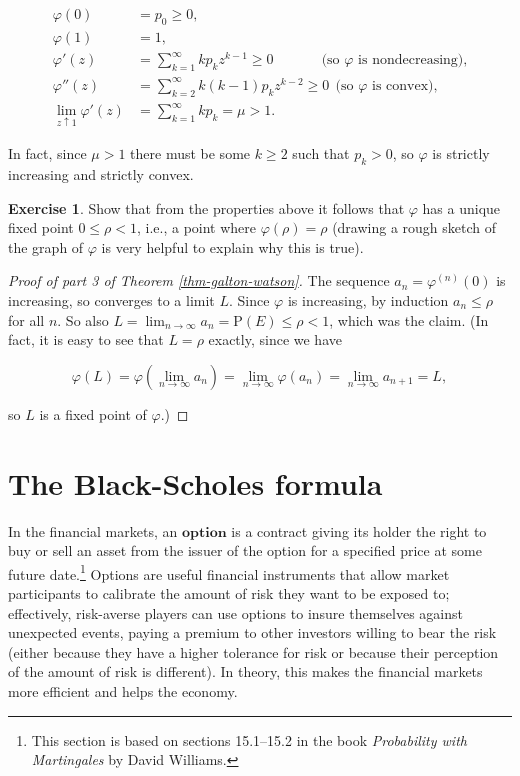 \documentclass[11pt]{report}
\theoremstyle{plain}
\theoremstyle{definition}
\newtheorem{xexercise}[thm]{Exercise}
\begin{document}
\begin{align*}
\varphi(0) &= p_0 \ge 0, \\
\varphi(1) &=1, \\
\varphi'(z) &= \sum_{k=1}^\infty k p_k z^{k-1} \ge 0 \qquad\quad\  \ \textrm{(so $\varphi$ is nondecreasing),}\\
\varphi''(z) &= \sum_{k=2}^\infty k(k-1) p_k z^{k-2} \ge 0 \ \ \textrm{(so $\varphi$ is convex)}, \\
\lim_{z\uparrow 1} \varphi'(z) &= \sum_{k=1}^\infty k p_k = \mu > 1.
\end{align*}

In fact, since $\mu>1$ there must be some $k\ge 2$ such that $p_k>0$, so $\varphi$ is strictly increasing and strictly convex.

\begin{xexercise}
Show that from the properties above it follows that $\varphi$ has a unique fixed point $0\le \rho<1$, i.e., a point where $\varphi(\rho)=\rho$ (drawing a rough sketch of the graph of $\varphi$ is very helpful to explain why this is true).
\end{xexercise}

\begin{proof}[Proof of part 3 of Theorem \ref{thm-galton-watson}]
The sequence $a_n = \varphi^{(n)}(0)$ is increasing, so converges to a limit $L$. Since $\varphi$ is increasing, by induction $a_n\le \rho$ for all $n$. So also $L=\lim_{n\to\infty} a_n = \mathrm{P}(E) \le \rho <1$, which was the claim. (In fact, it is easy to see that $L=\rho$ exactly, since we have

\[
\varphi(L)=\varphi(\lim_{n\to\infty} a_n) = \lim_{n\to\infty} \varphi(a_n) = \lim_{n\to\infty} a_{n+1} = L,
\]

so $L$ is a fixed point of $\varphi$.)
\end{proof}

\section{The Black-Scholes formula}
In the financial markets, an $\textbf{option}$ is a contract giving its holder the right to buy or sell an asset from the issuer of the option for a specified price at some future date.\footnote{This section is based on sections 15.1--15.2 in the book \emph{Probability with Martingales} by David Williams.} Options are useful financial instruments that allow market participants to calibrate the amount of risk they want to be exposed to; effectively, risk-averse players can use options to insure themselves against unexpected events, paying a premium to other investors willing to bear the risk (either because they have a higher tolerance for risk or because their perception of the amount of risk is different). In theory, this makes the financial markets more efficient and helps the economy.
\end{document}
